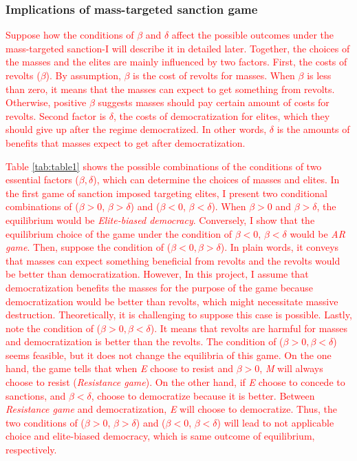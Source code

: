 \documentclass[11pt]{article}
\begin{document}
\subsubsection*{Implications of mass-targeted sanction game}

\textcolor{red}{Suppose how the conditions of $\beta$ and $\delta$ affect the possible outcomes under the mass-targeted sanction-I will describe it in detailed later.	Together, the choices of the masses and the elites are mainly influenced by two factors. First, the costs of revolts ($\beta$). By assumption, $\beta$ is the cost of revolts for masses. When $\beta$ is less than zero, it means that the masses can expect to get something from revolts. Otherwise, positive $\beta$ suggests masses should pay certain amount of costs for revolts. Second factor is $\delta$, the costs of democratization for elites, which they should give up after the regime democratized. In other words, $\delta$ is the amounts of benefits that masses expect to get after democratization.}

\textcolor{red}{Table \ref{tab:table1} shows the possible combinations of the conditions of two essential factors ($\beta, \delta$), which can determine the choices of masses and elites. In the first game of sanction imposed targeting elites, I present two conditional combinations of ($\beta > 0$, $\beta > \delta$) and ($\beta < 0$, $\beta < \delta$). When $\beta > 0$ and $\beta > \delta$, the equilibrium would be \textit{Elite-biased democracy}. Conversely, I show that the equilibrium choice of the game under the condition of $\beta < 0$, $\beta < \delta$ would be \textit{AR game}. Then, suppose the condition of ($\beta < 0, \beta > \delta$). In plain words, it conveys that masses can expect something beneficial from revolts and the revolts would be better than democratization. However, In this project, I assume that democratization benefits the masses for the purpose of the game because democratization would be better than revolts, which might necessitate massive destruction. Theoretically, it is challenging to suppose this case is possible. Lastly, note the condition of ($\beta > 0, \beta < \delta$). It means that revolts are harmful for masses and democratization is better than the revolts. The condition of ($\beta > 0, \beta < \delta$) seems feasible, but it does not change the equilibria of this game. On the one hand, the game tells that when \textit{E} choose to resist and $\beta>0$,  \textit{M} will always choose to resist (\textit{Resistance game}). On the other hand, if \textit{E} choose to concede to sanctions, and $\beta < \delta$,  choose to democratize because it is better. Between \textit{Resistance game} and democratization, \textit{E} will choose to democratize. Thus, the two conditions of ($\beta > 0$, $\beta > \delta$) and ($\beta < 0$, $\beta < \delta$) will lead to not applicable choice and elite-biased democracy, which is same outcome of equilibrium, respectively.}
\end{document}
